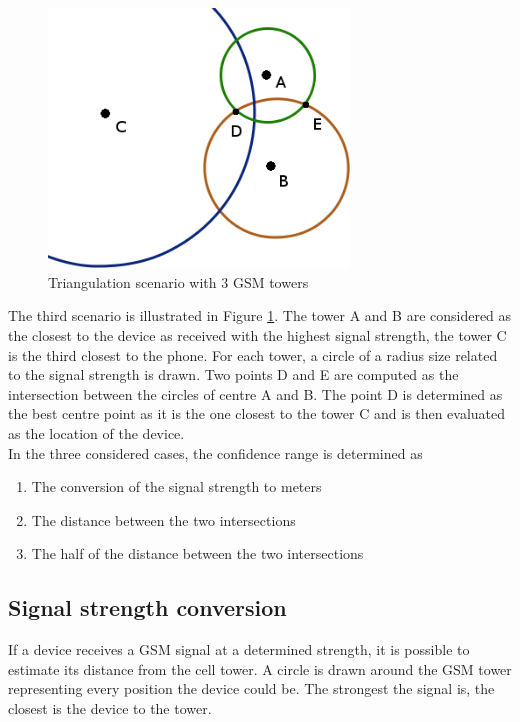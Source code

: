 \begin{figure}[h]
  \centering
  \includegraphics[width=8cm]{images/tower-schema.png}
  \caption{Triangulation scenario with 3 GSM towers}
  \label{fig:triangulation-scenario-3}
\end{figure}
The third scenario is illustrated in Figure \ref{fig:triangulation-scenario-3}.
The tower A and B are considered as the closest to the device as received with the highest signal strength, the tower C is the third closest to the phone.
For each tower, a circle of a radius size related to the signal strength is drawn.
Two points D and E are computed as the intersection between the circles of centre A and B.
The point D is determined as the best centre point as it is the one closest to the tower C and is then evaluated as the location of the device.\\

In the three considered cases, the confidence range is determined as
\begin{enumerate}
\item The conversion of the signal strength to meters
\item The distance between the two intersections
\item The half of the distance between the two intersections
\end{enumerate}


\subsection{Signal strength conversion}

If a device receives a GSM signal at a determined strength, it is possible to estimate its distance from the cell tower.
A circle is drawn around the GSM tower representing every position the device could be.
The strongest the signal is, the closest is the device to the tower.\\

